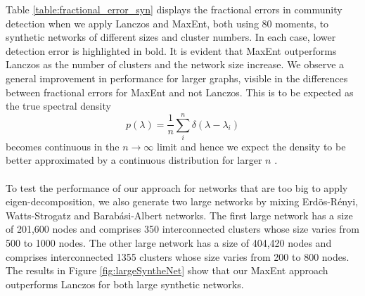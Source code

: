 \documentclass[letterpaper]{article} %
\begin{document}
Table \ref{table:fractional_error_syn} displays the fractional errors in community detection when we apply Lanczos and MaxEnt, both using 80 moments, to synthetic networks of different sizes and cluster numbers. In each case, lower detection error is highlighted in bold. It is evident that MaxEnt outperforms Lanczos as the number of clusters and the network size increase. 
We observe a general improvement in performance for larger graphs, visible in the differences between fractional errors for MaxEnt and not Lanczos. This is to be expected as the true spectral density
\begin{equation}
p(\lambda) = \frac{1}{n}\sum_{i}^{n}\delta(\lambda-\lambda_{i})
\end{equation}
becomes continuous in the $n\rightarrow\infty$ limit and hence we expect the density to be better approximated by a continuous distribution for larger $n$ \citep{ete}. %
\\\\
To test the performance of our approach for networks that are too big to apply eigen-decomposition, we also generate two large networks by mixing Erd{\"o}s-R{\'e}nyi, Watts-Strogatz and Barabási-Albert networks. The first large network has a size of  201,600 nodes and comprises 350 interconnected clusters whose size varies from 500 to 1000 nodes. The other large network has a size of 404,420 nodes and comprises interconnected 1355 clusters whose size varies from 200 to 800 nodes. The results in Figure \ref{fig:largeSyntheNet} show that our MaxEnt approach outperforms Lanczos for both large synthetic networks.
%
\end{document}
